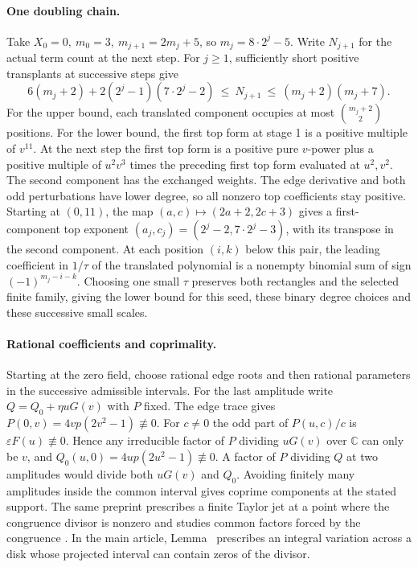 \paragraph{One doubling chain.}
Take \(X_0=0,\ m_0=3,\ m_{j+1}=2m_j+5\), so \(m_j=8\cdot2^j-5\). Write \(N_{j+1}\) for the actual term count at the next step. For \(j\ge1\), sufficiently short positive transplants at successive steps give
\[
 6(m_j+2)+2(2^j-1)(7\cdot2^j-2)
 \ \le\ N_{j+1}\ \le\ (m_j+2)(m_j+7).
\]
For the upper bound, each translated component occupies at most \(\binom{m_j+2}{2}\) positions. For the lower bound, the first top form at stage 1 is a positive multiple of \(v^{11}\). At the next step the first top form is a positive pure \(v\)-power plus a positive multiple of \(u^2v^3\) times the preceding first top form evaluated at \(u^2,v^2\). The second component has the exchanged weights. The edge derivative and both odd perturbations have lower degree, so all nonzero top coefficients stay positive. Starting at \((0,11)\), the map \((a,c)\mapsto(2a+2,2c+3)\) gives a first-component top exponent \((a_j,c_j)=(2^j-2,7\cdot2^j-3)\), with its transpose in the second component. At each position \((i,k)\) below this pair, the leading coefficient in \(1/\tau\) of the translated polynomial is a nonempty binomial sum of sign \((-1)^{m_j-i-k}\). Choosing one small \(\tau\) preserves both rectangles and the selected finite family, giving the lower bound for this seed, these binary degree choices and these successive small scales.

\paragraph{Rational coefficients and coprimality.}
Starting at the zero field, choose rational edge roots and then rational parameters in the successive admissible intervals. For the last amplitude write \(Q=Q_0+\eta uG(v)\) with \(P\) fixed. The edge trace gives \(P(0,v)=4vp(2v^2-1)\not\equiv0\). For \(c\ne0\) the odd part of \(P(u,c)/c\) is \(\varepsilon F(u)\not\equiv0\). Hence any irreducible factor of \(P\) dividing \(uG(v)\) over \(\mathbb C\) can only be \(v\), and \(Q_0(u,0)=4up(2u^2-1)\not\equiv0\). A factor of \(P\) dividing \(Q\) at two amplitudes would divide both \(uG(v)\) and \(Q_0\). Avoiding finitely many amplitudes inside the common interval gives coprime components at the stated support. The same preprint prescribes a finite Taylor jet at a point where the congruence divisor is nonzero and studies common factors forced by the congruence \cite[{\S}7.1, p.~17, and Proposition~7.3, p.~18]{LuRenewal}. In the main article, Lemma~ prescribes an integral variation across a disk whose projected interval can contain zeros of the divisor.
